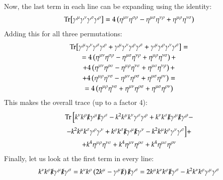 \documentclass{article}
\begin{document}
Now, the last term in each line can be expanding using the identity:
\begin{equation}
    \Tr[\gamma^\mu \gamma^\nu\gamma^\sigma \gamma^\rho] = 4\left(
        \eta^{\mu\nu}\eta^{\sigma\rho} -
        \eta^{\mu\sigma}\eta^{\nu\rho} +
        \eta^{\mu\rho}\eta^{\nu\sigma}
    \right)
\end{equation}
Adding this for all three permutations:
\begin{equation}
\begin{gathered}
    \Tr[\gamma^\mu \gamma^\nu\gamma^\sigma \gamma^\rho + \gamma^\mu \gamma^\nu \gamma^\rho \gamma^\sigma + \gamma^\mu \gamma^\rho\gamma^\nu \gamma^\sigma] = \\ =
    4\left(
        \eta^{\mu\nu}\eta^{\sigma\rho} -
        \eta^{\mu\sigma}\eta^{\nu\rho} +
        \eta^{\mu\rho}\eta^{\nu\sigma}
    \right) + \\ +
    4\left(
        \eta^{\mu\nu}\eta^{\rho\sigma} -
        \eta^{\mu\rho}\eta^{\nu\sigma} +
        \eta^{\mu\sigma}\eta^{\nu\rho}
    \right) + \\ +
    4\left(
        \eta^{\mu\rho}\eta^{\nu\sigma} -
        \eta^{\mu\nu}\eta^{\rho\sigma} +
        \eta^{\mu\sigma}\eta^{\rho\nu}
    \right) = \\ =
    4\left(
        \eta^{\mu\rho}\eta^{\nu\sigma} +
        \eta^{\mu\nu}\eta^{\rho\sigma} +
        \eta^{\mu\sigma}\eta^{\rho\nu}
    \right)
\end{gathered}
\end{equation}
This makes the overall trace (up to a factor 4):
\begin{equation}
\begin{gathered}
    \Tr \Big[
    k^\nu k^\rho \slashed{k}\gamma^\mu\slashed{k}\gamma^\sigma -
    k^2 k^\mu k^\nu\gamma^\sigma\gamma^\rho +
    k^\nu k^\sigma \slashed{k}\gamma^\mu \slashed{k}\gamma^\rho - \\ -
    k^2 k^\mu k^\sigma \gamma^\rho\gamma^\nu + 
    k^\rho k^\sigma \slashed{k}\gamma^\mu \slashed{k}\gamma^\nu -
    k^2 k^\mu k^\rho \gamma^\nu\gamma^\sigma \Big] + \\ +
    k^4\eta^{\mu\rho}\eta^{\nu\sigma} + 
    k^4\eta^{\mu\nu}\eta^{\rho\sigma} + 
    k^4\eta^{\mu\sigma}\eta^{\rho\nu}
\end{gathered}
\end{equation}
Finally, let us look at the first term in every line:
\begin{equation}
    k^\nu k^\rho \slashed{k}\gamma^\mu\slashed{k}\gamma^\sigma = 
    k^\nu k^\rho \left(
        2 k^\mu - \gamma^\mu \slashed{k}
    \right)\slashed{k}\gamma^\sigma =
    2k^\mu k^\nu k^\rho \slashed{k}\gamma^\sigma -
    k^2 k^\nu k^\rho \gamma^\mu \gamma^\sigma
\end{equation}
\end{document}
